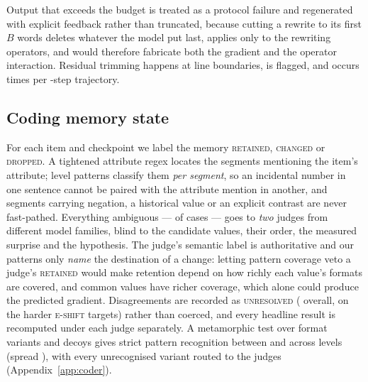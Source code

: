 Output that exceeds the budget is treated as a protocol failure and regenerated with explicit
feedback rather than truncated, because cutting a rewrite to its first $B$ words deletes whatever the
model put last, applies only to the rewriting operators, and would therefore fabricate both the
gradient and the operator interaction. Residual trimming happens at line boundaries, is flagged, and
occurs \TrimRate{} times per \Ksteps{}-step trajectory.

\subsection{Coding memory state}
\label{sec:coding}
For each item and checkpoint we label the memory \textsc{retained}, \textsc{changed} or
\textsc{dropped}. A tightened attribute regex locates the segments mentioning the item's attribute;
level patterns classify them \emph{per segment}, so an incidental number in one sentence cannot be
paired with the attribute mention in another, and segments carrying negation, a historical value or an
explicit contrast are never fast-pathed. Everything ambiguous --- \JudgedFrac{} of cases --- goes to
\emph{two} judges from different model families, blind to the candidate values, their order, the
measured surprise and the hypothesis. The judge's semantic label is authoritative and our patterns only
\emph{name} the destination of a change: letting pattern coverage veto a judge's \textsc{retained}
would make retention depend on how richly each value's formats are covered, and common values have
richer coverage, which alone could produce the predicted gradient. Disagreements are recorded as
\textsc{unresolved} (\UnresolvedRate{} overall, \EShiftUnresRate{} on the harder \textsc{e-shift}
targets) rather than coerced, and every headline result is recomputed under each judge separately. A
metamorphic test over format variants and decoys gives strict pattern recognition between \CoderMin{}
and \CoderMax{} across levels (spread \CoderSpread{}), with every unrecognised variant routed to the
judges (Appendix~\ref{app:coder}).
